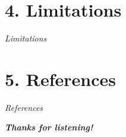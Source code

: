 \documentclass[xcolor=dvipsnames]{beamer}
\begin{document}
\section{4. Limitations}
\begin{frame}{\textit{Limitations}}
    
\end{frame}

\section{5. References}
\begin{frame}[allowframebreaks]{\textit{References}}
    \printbibliography
\end{frame}

\begin{frame}{}
\begin{center}
    \fontsize{18}{20}\color{GECBlue}\textbf{\textit{Thanks for listening!}}
\end{center}
\end{frame}
\end{document}
